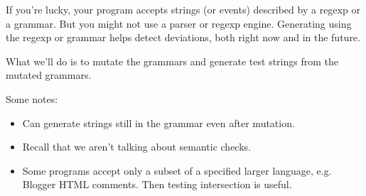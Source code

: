 \documentclass[11pt]{article}
\begin{document}
If you're lucky, your program accepts strings (or events) described by a regexp or a grammar. But you might not use a parser or regexp engine. Generating using the regexp or grammar helps detect deviations, both right now and in the future.

What we'll do is to mutate the grammars and generate test strings from the mutated grammars.

Some notes:
\begin{itemize}
\item Can generate strings still in the grammar even after mutation.
\item Recall that we aren't talking about semantic checks.
\item Some programs accept only a subset of a specified larger language,
e.g. Blogger HTML comments. Then testing intersection is useful.
\end{itemize}
\end{document}
